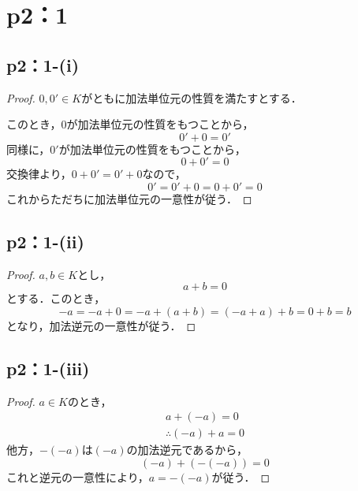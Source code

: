 \documentclass[a4paper,10pt,fleqn]{ltjsarticle}
\begin{document}
\section*{p2：1}


\subsection*{p2：1-(i)}

\begin{leftbar}
\begin{proof}
$0,0' \in K$がともに加法単位元の性質を満たすとする．

このとき，$0$が加法単位元の性質をもつことから，
\[
    0'+0=0'
\]
同様に，$0'$が加法単位元の性質をもつことから，
\[
    0+0' = 0
\]
交換律より，$0+0'=0'+0$なので，
\[
    0'=0'+0 =0+0' =0
\]
これからただちに加法単位元の一意性が従う．
    \end{proof}
\end{leftbar}

\subsection*{p2：1-(ii)}

\begin{leftbar}
\begin{proof}
$a ,b \in K$とし，
\[
    a+b =0
\]
とする．このとき，
\[
    -a = -a+0 = -a +(a+b)=(-a+a)+b =0+b = b
\]
となり，加法逆元の一意性が従う．
        \end{proof}
    \end{leftbar}

    \subsection*{p2：1-(iii)}

\begin{leftbar}
\begin{proof}
$a \in K$のとき，
\begin{gather*}
    a+(-a)=0 \\
    \therefore (-a)+a =0
\end{gather*}
他方，$-(-a)$は$(-a)$の加法逆元であるから，
\[
    (-a)+(-(-a))=0
\]
これと逆元の一意性により，$a=-(-a)$が従う．
\end{proof}
\end{leftbar}
\end{document}

